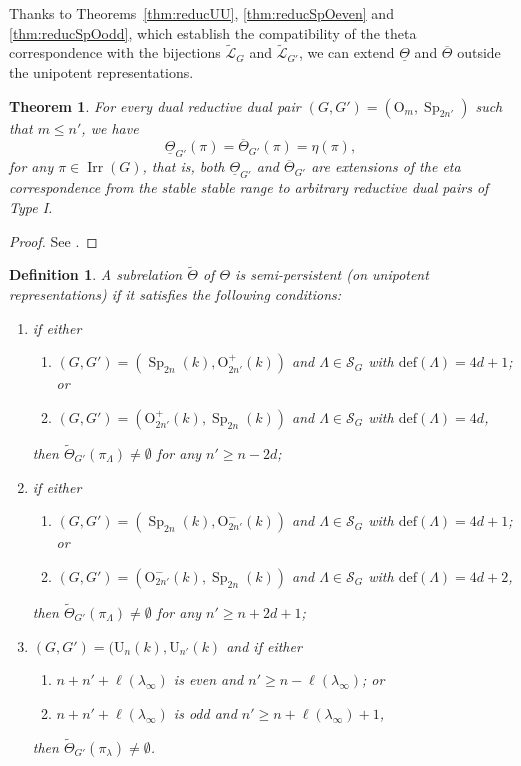\documentclass[12pt]{amsart}
\numberwithin{equation}{subsection}
\newtheorem{defn}[equation]{Definition}
\newtheorem{thm}[equation]{Theorem}
\newcommand{\cL}{\mathcal{L}}
\newcommand{\tcL}{{\widetilde{\cL}}}
\newcommand{\cS}{\mathcal{S}}
\newcommand{\rU}{\mathrm{U}}
\newcommand{\Irr}{\operatorname{Irr}}
\newcommand{\Sp}{\operatorname{Sp}}
\def\rO{{\mathrm{O}}}
\def\defect{{\mathrm{def}}}
\begin{document}
Thanks to Theorems~\ref{thm:reducUU}, \ref{thm:reducSpOeven} and \ref{thm:reducSpOodd}, which establish the compatibility of the theta correspondence with the bijections $\tcL_G$ and $\tcL_{G'}$, we can extend 
$\underline{\Theta}$ and $\overline{\Theta}$ outside the unipotent representations.

\begin{thm}
For every dual reductive dual pair  $(G,G')=(\rO_m,\Sp_{2n'})$ such that $m\le n'$, we have 
\[\underline{\Theta}_{G'}(\pi)=\overline{\Theta}_{G'}(\pi)=\eta(\pi),\]
for any $\pi\in\Irr(G)$, that is, both $\underline{\Theta}_{G'}$ and $\overline{\Theta}_{G'}$ are extensions of the eta 
correspondence from the stable stable range to arbitrary reductive dual pairs of Type I.
\end{thm}
\begin{proof}
See \cite[Theorem~6.13]{Pan-eta-SpO}.
\end{proof}

\begin{defn} {\rm 
A subrelation $\widetilde{\Theta}$ of $\Theta$ is \textit{semi-persistent} (on unipotent representations) if it satisfies the following conditions:
\begin{enumerate}
\item if either 
\begin{enumerate} 
\item $(G,G')=(\Sp_{2n}(k),\rO_{2n'}^+(k))$ and $\Lambda\in\cS_G$ with $\defect(\Lambda)=4d+1$; or
\item $(G,G')=(\rO_{2n'}^+(k),\Sp_{2n}(k))$ and $\Lambda\in\cS_G$ with $\defect(\Lambda)=4d$,
\end{enumerate}
then $\widetilde\Theta_{G'}(\pi_\Lambda)\ne\emptyset$ for any $n'\ge n-2d$;
\item if either 
\begin{enumerate} 
\item $(G,G')=(\Sp_{2n}(k),\rO_{2n'}^-(k))$ and $\Lambda\in\cS_G$ with $\defect(\Lambda)=4d+1$; or
\item $(G,G')=(\rO_{2n'}^-(k),\Sp_{2n}(k))$ and $\Lambda\in\cS_G$ with $\defect(\Lambda)=4d+2$,
\end{enumerate}
then $\widetilde\Theta_{G'}(\pi_\Lambda)\ne\emptyset$ for any $n'\ge n+2d+1$;
\item  $(G,G')=(\rU_n(k),\rU_{n'}(k)$ and if either
\begin{enumerate} 
\item  $n + n'+ \ell(\lambda_\infty)$ is even and $n'\ge n - \ell(\lambda_\infty)$; or
\item  $n + n' +\ell(\lambda_\infty)$ is odd and $n'\ge  n + \ell(\lambda_\infty)+1$,
\end{enumerate}
then $\widetilde\Theta_{G'}(\pi_\lambda)\ne\emptyset$.
\end{enumerate}
}
\end{defn}
\end{document}

